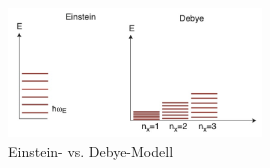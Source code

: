 \begin{figure}[H]
 \centering
 \includegraphics[width=0.6\textwidth]{resources/15-06-2015/Einstein_Debye.jpeg}
 \caption{Einstein- vs. Debye-Modell}
\end{figure}
\newpage
